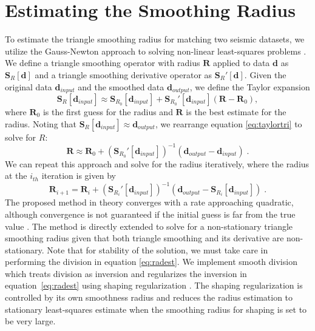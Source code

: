 \section{Estimating the Smoothing Radius}
To estimate the triangle smoothing radius for matching two seismic datasets, we utilize the Gauss-Newton approach to solving non-linear least-squares problems \cite[]{lawson1995}. We define a triangle smoothing operator with radius $\mathbf{R}$ applied to data $\mathbf{d}$ as $\mathbf{S}_R[\mathbf{d}]$ and a triangle smoothing derivative operator as $\mathbf{S}_R'[\mathbf{d}]$. 
Given the original data $\mathbf{d}_{input}$ and the smoothed data $\mathbf{d}_{output}$, we define the Taylor expansion
\begin{equation}
\mathbf{S}_R[\mathbf{d}_{input}] \approx \mathbf{S}_{R_0}[\mathbf{d}_{input}] + \mathbf{S}_{R_0}'[\mathbf{d}_{input}](\mathbf{R}-\mathbf{R}_0),
\label{eq:taylortri}
\end{equation}
where $\mathbf{R}_0$ is the first guess for the radius and $\mathbf{R}$ is the best estimate for the radius. Noting that $\mathbf{S}_R[\mathbf{d}_{input}] \approx \mathbf{d}_{output}$, we rearrange equation \ref{eq:taylortri} to solve for $R$:
\begin{equation}
\mathbf{R} \approx \mathbf{R}_0 + \left(\mathbf{S}_{R_0}'[\mathbf{d}_{input}]\right)^{-1}\left(\mathbf{d}_{output} - \mathbf{d}_{input}\right)\;.
\label{eq:rad}
\end{equation}
We can repeat this approach and solve for the radius iteratively, where the radius at the $i_{th}$ iteration is given by
\begin{equation}
\mathbf{R}_{i+1} = \mathbf{R}_i + \left(\mathbf{S}_{R_i}'[\mathbf{d}_{input}]\right)^{-1}\left(\mathbf{d}_{output} - \mathbf{S}_{R_i}[\mathbf{d}_{input}]\right)\;.
\label{eq:radest}
\end{equation}
The proposed method in theory converges with a rate approaching quadratic, although convergence is not guaranteed if the initial guess is far from the true value \cite[]{lawson1995}. The method is directly extended to solve for a non-stationary triangle smoothing radius given that both triangle smoothing and its derivative are non-stationary. Note that for stability of the solution, we must take care in performing the division in equation \ref{eq:radest}. We implement smooth division which treats division as inversion and regularizes the inversion in equation~\ref{eq:radest} using shaping regularization \cite[]{fomel2007b}. 
The shaping regularization is controlled by its own smoothness radius and reduces the radius estimation to stationary least-squares estimate when the smoothing radius for shaping is set to be very large.

